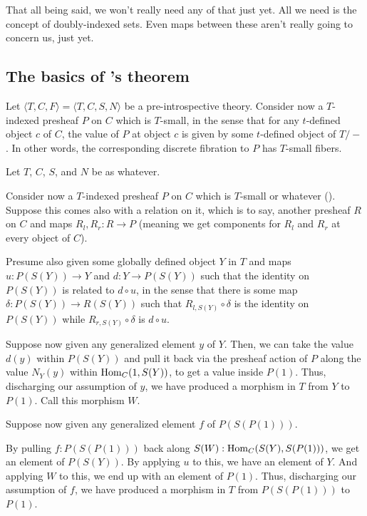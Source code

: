 That all being said, we won't really need any of that just yet. All we need is the concept of doubly-indexed sets. Even maps between these aren't really going to concern us, just yet.

\subsection{The basics of \Loeb's theorem}
Let $\langle T, C, F \rangle = \langle T, C, S, N \rangle$ be a pre-introspective theory. Consider now a $T$-indexed presheaf $P$ on $C$ which is $T$-small, in the sense that for any $t$-defined object $c$ of $C$, the value of $P$ at object $c$ is given by some $t$-defined object of $T/-$. In other words, the corresponding discrete fibration to $P$ has $T$-small fibers.

 Let $T$, $C$, $S$, and $N$ be as whatever.

Consider now a $T$-indexed presheaf $P$ on $C$ which is $T$-small or whatever (\TODO). Suppose this comes also with a relation on it, which is to say, another presheaf $R$ on $C$ and maps $R_l, R_r : R \to P$ (meaning we get components for $R_l$ and $R_r$ at every object of $C$).

Presume also given some globally defined object $Y$ in $T$ and maps $u: P(S(Y)) \to Y$ and $d : Y \to P(S(Y))$ such that the identity on $P(S(Y))$ is related to $d \circ u$, in the sense that there is some map $\delta : P(S(Y)) \to R(S(Y))$ such that $R_{l, S(Y)} \circ \delta$ is the identity on $P(S(Y))$ while $R_{r, S(Y)} \circ \delta$ is $d \circ u$.

Suppose now given any generalized element $y$ of $Y$. Then, we can take the value $d(y)$ within $P(S(Y))$ and pull it back via the presheaf action of $P$ along the value $N_Y(y)$ within $\operatorname{Hom}_C(1, S(Y))$, to get a value inside $P(1)$. Thus, discharging our assumption of $y$, we have produced a morphism in $T$ from $Y$ to $P(1)$. Call this morphism $W$.

Suppose now given any generalized element $f$ of $P(S(P(1)))$.

By pulling $f :P(S(P(1)))$ back along $S(W) : \operatorname{Hom}_C(S(Y), S(P(1)))$, we get an element of $P(S(Y))$. By applying $u$ to this, we have an element of $Y$. And applying $W$ to this, we end up with an element of $P(1)$. Thus, discharging our assumption of $f$, we have produced a morphism in $T$ from $P(S(P(1)))$ to $P(1)$.

